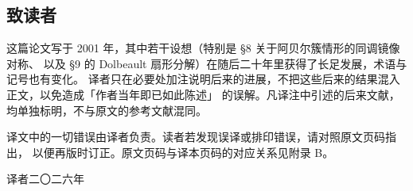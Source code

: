 \subsection*{致读者}

这篇论文写于 2001 年，其中若干设想（特别是 §8 关于阿贝尔簇情形的同调镜像对称、
以及 §9 的 Dolbeault 扇形分解）在随后二十年里获得了长足发展，术语与记号也有变化。
译者只在必要处加注说明后来的进展，不把这些后来的结果混入正文，以免造成「作者当年即已如此陈述」
的误解。凡译注中引述的后来文献，均单独标明，不与原文的参考文献混同。

\medskip
\noindent 译文中的一切错误由译者负责。读者若发现误译或排印错误，请对照原文页码指出，
以便再版时订正。原文页码与译本页码的对应关系见附录 B。

\vspace{1.2em}
\noindent\hfill 译者\quad 二〇二六年
